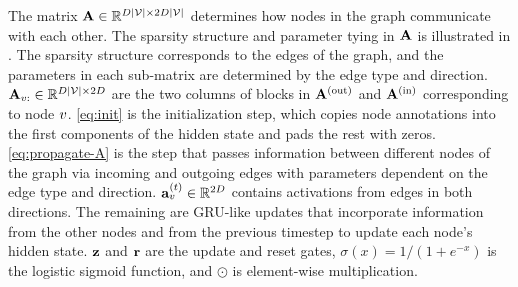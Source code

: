 \documentclass{article}
\begin{document}
The matrix $\mathbf{A} \in \mathbb{R}^{D|\mathcal{V}| \times 2 D |\mathcal{V}|}$ determines
how nodes in the graph communicate with each other. The sparsity
structure and parameter tying in $\mathbf{A}$ is illustrated in
. The sparsity structure corresponds to the
edges of the graph, and the parameters in each
sub-matrix are determined by the edge type and direction.
$\mathbf{A}_{v:} \in \mathbb{R}^{D|\mathcal{V}| \times 2 D}$ are the two columns of blocks
in $\mathbf{A}^{(\mathrm{out})}$ and $\mathbf{A}^{(\mathrm{in})}$ corresponding to node $v$.
\eqref{eq:init} is the initialization step, which copies node annotations
into the first components of the hidden state and pads the rest with
zeros.  \eqref{eq:propagate-A} is the step that passes information
between different nodes of the graph via incoming and outgoing edges
with parameters dependent on the edge type and direction.
$\mathbf{a}_{v}^{(t)}\in\mathbb{R}^{2D}$ contains activations from edges in both
directions.
The remaining are GRU-like updates that incorporate information from the
other nodes and from the previous timestep to update each node's
hidden state.  $\mathbf{z}$ and $\mathbf{r}$ are the update and
reset gates, $\sigma(x)=1/(1+e^{-x})$ is the logistic sigmoid
function, and $\odot$ is element-wise multiplication. %
\end{document}
